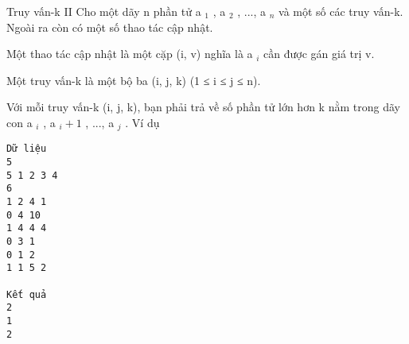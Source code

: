 Truy vấn-k II
Cho một dãy n phần tử a   $_    1   $   ,   a   $_    2   $   , ..., a   $_    n   $   và một số các truy vấn-k. Ngoài ra còn có một số thao tác cập nhật.  

   Một thao tác cập nhật là một cặp (i, v) nghĩa là a   $_    i   $   cần được gán giá trị v.  

   Một truy vấn-k là một bộ ba (i, j, k) (1 ≤ i ≤ j ≤ n).  

   Với mỗi truy vấn-k (i, j, k), bạn phải trả về số phần tử lớn hơn k nằm trong dãy con a   $_    i   $   ,   a   $_    i+1   $   , ..., a   $_    j   $   .
Ví dụ
\begin{verbatim}
Dữ liệu
5
5 1 2 3 4
6
1 2 4 1
0 4 10
1 4 4 4
0 3 1
0 1 2
1 1 5 2  

Kết quả
2
1
2 
\end{verbatim}